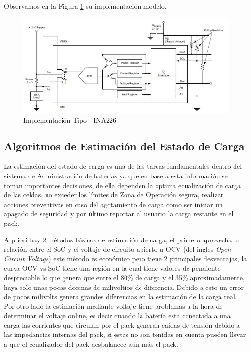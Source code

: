 \documentclass[10pt,a4paper]{article}
\begin{document}
	Observamos en la Figura \ref{fig:ina226-commonimplementation} su 
    implementación modelo. 
	
	\begin{figure}[h!]
		\begin{center}
			\includegraphics[width=0.6\linewidth]{assets/INA226-Common_Implementation}
			\caption{Implementación Tipo - INA226}
			\label{fig:ina226-commonimplementation}
		\end{center}	
	\end{figure}
	
    \clearpage	
	
	\subsection{Algoritmos de Estimación del Estado de Carga}

	La estimación del estado de carga es una de las tareas fundamentales dentro 
    del sistema de Administración de baterías ya que en base a esta información 
    se toman importantes decisiones, de ella dependen la optima ecualización de 
    carga de las celdas, no exceder los límites de Zona de Operación segura, 
    realizar acciones preventivas en caso del agotamiento de carga como ser 
    iniciar un apagado de seguridad y por último reportar al usuario la carga 
    restante en el pack.

	\noindent A priori hay 2 métodos básicos de estimación de carga, 
    el primero aprovecha la relación entre el SoC y el voltaje de circuito
    abierto u OCV (del ingles \emph{Open Circuit Voltage}) este método es 
    económico pero tiene 2 principales desventajas, la curva OCV vs SoC tiene 
    una región en la cual tiene valores de pendiente despreciable lo que genera 
    que entre el 80\% de carga y el 35\% aproximadamente, haya solo unas pocas 
    decenas de milivoltios de diferencia. Debido a esto un error de pocos 
    milivolts genera grandes diferencias en la estimación de la carga real. 
    Por otro lado la estimación mediante voltaje tiene problemas a la hora de 
    determinar el voltaje online, es decir cuando la batería esta conectada a 
    una carga las corrientes que circulan por el pack generan caidas de tensión 
    debido a las impedancias internas del pack, si estas no son tenidas en 
    cuenta pueden llevar a que el ecualizador del pack desbalancee aún más el 
    pack.
\end{document}
